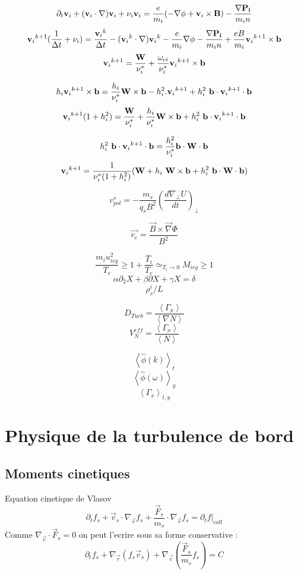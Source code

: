 \documentclass[12pt]{article}
\begin{document}
\newpage

$$\partial_t{\mathbf{v}_i}+(\mathbf{v}_i\cdot\mathbf{\nabla})\mathbf{v}_i+\nu_i\mathbf{v}_i=\frac{e}{m_i}(-\mathbf{\nabla\phi}+\mathbf{v}_i\times\mathbf{B})-\frac{\mathbf{\nabla P_i}}{m_in}$$
$${\mathbf{v}_i}^{k+1}(\frac{1}{\Delta t}+\nu_i)=\frac{{\mathbf{v}_i}^{k}}{\Delta t}-({\mathbf{v}_i}^{k}\cdot\mathbf{\nabla}){\mathbf{v}_i}^{k}-\frac{e}{m_i}\mathbf{\nabla\phi}-\frac{\mathbf{\nabla P_i}}{m_in}+\frac{eB}{m_i}{\mathbf{v}_i}^{k+1}\times\mathbf{b}$$
$${\mathbf{v}_i}^{k+1}=\frac{\mathbf{W}}{\nu_i^*}+\frac{\omega_{ci}}{\nu_i^*}{\mathbf{v}_i}^{k+1}\times\mathbf{b}$$

$$h_i{\mathbf{v}_i}^{k+1}\times\mathbf{b}=\frac{h_i}{\nu_i^*}\mathbf{W}\times\mathbf{b}-h_i^2\text{.} {\mathbf{v}_i}^{k+1}+h_i^2\text{~}\mathbf{b}\cdot{\mathbf{v}_i}^{k+1}\cdot\mathbf{b}$$
$${\mathbf{v}_i}^{k+1}(1+h_i^2)=\frac{\mathbf{W}}{\nu_i^*}+\frac{h_i}{\nu_i^*}\mathbf{W}\times\mathbf{b}+h_i^2\text{~}\mathbf{b}\cdot{\mathbf{v}_i}^{k+1}\cdot\mathbf{b}$$

$$h_i^2\text{~}\mathbf{b}\cdot{\mathbf{v}_i}^{k+1}\cdot\mathbf{b}=\frac{h_i^2}{\nu_i^*}\mathbf{b}\cdot\mathbf{W}\cdot\mathbf{b}$$
$${\mathbf{v}_i}^{k+1}=\frac{1}{\nu_i^*(1+h_i^2)}(\mathbf{W}+h_i\text{~}\mathbf{W}\times\mathbf{b}+h_i^2\text{~}\mathbf{b}\cdot\mathbf{W}\cdot\mathbf{b})$$



$$v^s_{pol}=-\frac{m_s}{q_sB^2}\left(\frac{d\nabla_\bot U}{dt}\right)_\bot$$

$$\vec{v_{e}}=\frac{\vec{B}\times\vec{\nabla}\Phi}{B^2}$$


$$\frac{m_iu^2_{ieg}}{T_e}\ge 1+\frac{T_i}{T_e} \simeq_{T_i\to0} M_{ieg}\ge 1$$
$$\alpha\partial_2X+\beta\partial X+\gamma X = \delta$$
$$\rho_s^i/L$$

$$D_{Turb}=\frac{\left<\Gamma_x\right>}{\left<\nabla N\right>}$$
$$V^{eff}_N=\frac{\left<\Gamma_x\right>}{\left<N\right>}$$

$$\left<\hat{\phi}(k)\right>_{t}$$
$$\left<\hat{\phi}(\omega)\right>_{y}$$
$$\left<\Gamma_x\right>_{t,y}$$
\newpage
\section{Physique de la turbulence de bord}
\subsection{Moments cinetiques}
Equation cinetique de Vlasov 
$$\partial_t f_s
+\vec{v}_s\cdot\nabla_{\vec{r}}f_s+\frac{\vec{F}_s}{m_s}\cdot\nabla_{\vec{v}}f_s=\partial_tf{|_{coll}}$$
Comme $\nabla_{\vec{v}}\cdot\vec{F}_s=0$ on peut l'ecrire sous sa forme
conservative :
$$\partial_t f_s
+\nabla_{\vec{r}}\left(f_s\vec{v}_s\right)+\nabla_{\vec{v}}\left(\frac{\vec{F}_s}{m_s}f_s\right)=C$$
\end{document}
